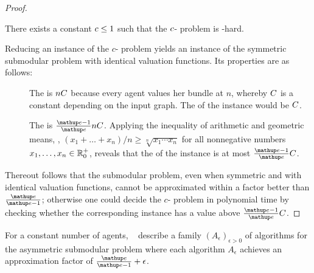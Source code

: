 \begin{proof}
	\begin{proposition}
		There exists a constant \(c \le 1\) such that the \(c\)-\Gap{} problem is \NP-hard.
	\end{proposition}
	Reducing an instance of the \(c\)-\Gap{} problem yields an instance of the symmetric submodular \SW{} problem with identical valuation functions.
	Its properties are as follows:
	\begin{description}
		\item[\Yes]
		The \SW{} is \(n C\) because every agent values her bundle at \(n\), whereby \(C\) is a constant depending on the input graph.
		The \NSW{} of the instance would be \(C\).

		\item[\No]
		The \SW{} is \(\frac{\euler - 1}{\euler} n \swconstant\).
		Applying the inequality of arithmetic and geometric means, \ie{}, \((x_1 + \dots + x_n)/n \ge \sqrt[n]{x_1 \dotsm x_n}\) for all nonnegative numbers \(x_1, \dots, x_n \in \realposzero\), reveals that the \NSW{} of the instance is at most \(\frac{\euler - 1}{\euler} \swconstant\).
	\end{description}
	Thereout follows that the submodular \NSW{} problem, even when symmetric and with identical valuation functions, cannot be approximated within a factor better than \(\frac{\euler}{\euler - 1}\);
	otherwise one could decide the \(c\)-\Gap{} problem in polynomial time by checking whether the corresponding \NSW{} instance has a value above \(\frac{\euler - 1}{\euler} \swconstant\).
\end{proof}

For a constant number of agents, \citeauthor{APNSWuSVþUM}~\cite[Section 5.1]{APNSWuSVþUM} describe a family \((A_{\epsilon})_{\epsilon > 0}\) of algorithms for the asymmetric submodular \NSW{} problem where each algorithm \(A_\epsilon\) achieves an approximation factor of \(\frac{\euler}{\euler - 1} + \epsilon\).

